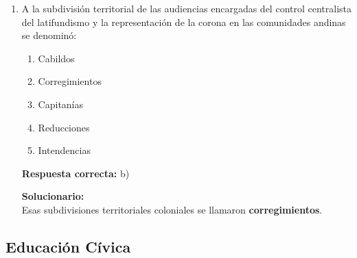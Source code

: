 \begin{enumerate}
	\vspace{2mm}
	\textbf{Solucionario:}\\
	El yacimiento hortícola más antiguo señalado es \textbf{Guitarrero}.
	
	\vspace{6mm}
	
	\item A la subdivisión territorial de las audiencias encargadas del control centralista del latifundismo y la representación de la corona en las comunidades andinas se denominó:
	\begin{enumerate}[label=\alph*)]
		\item Cabildos
		\item Corregimientos
		\item Capitanías
		\item Reducciones
		\item Intendencias
	\end{enumerate}
	\textbf{Respuesta correcta:} b)
	
	\vspace{2mm}
	\textbf{Solucionario:}\\
	Esas subdivisiones territoriales coloniales se llamaron \textbf{corregimientos}.
	
	\vspace{6mm}
	
\end{enumerate}

\subsection*{Educación Cívica}

